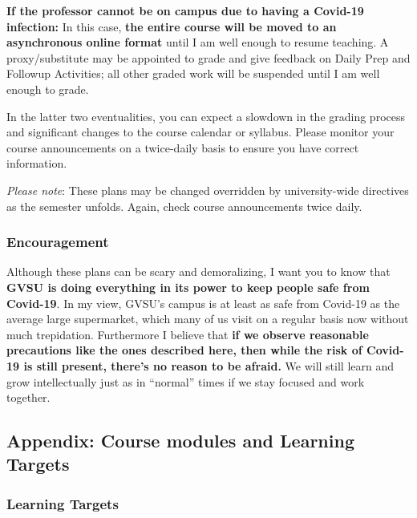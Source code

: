 \documentclass[]{article}
\begin{document}
\textbf{If the professor cannot be on campus due to having a Covid-19
infection:} In this case, \textbf{the entire course will be moved to an
asynchronous online format} until I am well enough to resume teaching. A
proxy/substitute may be appointed to grade and give feedback on Daily
Prep and Followup Activities; all other graded work will be suspended
until I am well enough to grade.

In the latter two eventualities, you can expect a slowdown in the
grading process and significant changes to the course calendar or
syllabus. Please monitor your course announcements on a twice-daily
basis to ensure you have correct information.

\emph{Please note}: These plans may be changed overridden by
university-wide directives as the semester unfolds. Again, check course
announcements twice daily.

\hypertarget{encouragement}{%
\subsubsection{Encouragement}\label{encouragement}}

Although these plans can be scary and demoralizing, I want you to know
that \textbf{GVSU is doing everything in its power to keep people safe
from Covid-19}. In my view, GVSU's campus is at least as safe from
Covid-19 as the average large supermarket, which many of us visit on a
regular basis now without much trepidation. Furthermore I believe that
\textbf{if we observe reasonable precautions like the ones described
here, then while the risk of Covid-19 is still present, there's no
reason to be afraid.} We will still learn and grow intellectually just
as in ``normal'' times if we stay focused and work together.

\hypertarget{appendix-course-modules-and-learning-targets}{%
\subsection{Appendix: Course modules and Learning
Targets}\label{appendix-course-modules-and-learning-targets}}

\hypertarget{learning-targets}{%
\subsubsection{Learning Targets}\label{learning-targets}}
\end{document}
